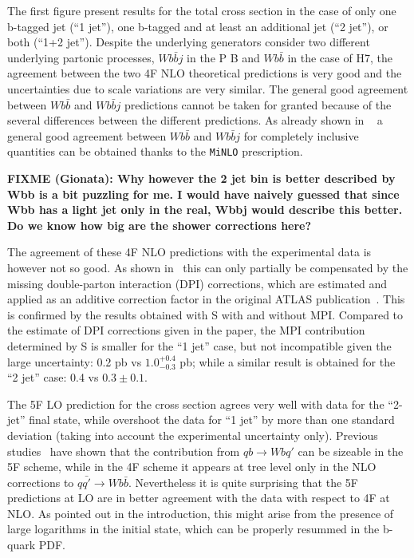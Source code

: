 \documentclass[11pt]{cernrep}
\newcommand{\Sherpa}{S\protect\scalebox{0.8}{HERPA}\xspace}
\newcommand{\Herwig}{H\protect\scalebox{0.8}{ERWIG}7\xspace}
\newcommand\MINLO{{\tt MiNLO}}
\newcommand{\POWHEGBOX}{P\protect\scalebox{0.8}{OWHEG} B\protect\scalebox{0.8}{OX}\xspace}
\begin{document}
The first figure present results for the total cross section in the case of only one
b-tagged jet (``1 jet''), one b-tagged and at least an additional jet
(``2 jet''), or both (``1+2 jet''). Despite the underlying generators
consider two different underlying partonic processes, $Wb\bar{b}j$ in
the \POWHEGBOX{} and $Wb\bar{b}$ in the case of \Herwig, the agreement
between the two 4F NLO theoretical predictions is very good and the uncertainties
due to scale variations are very similar. The general good agreement
between $Wb\bar{b}$ and $Wb\bar{b}j$ predictions cannot be taken for
granted because of the several differences between the different
predictions. As already shown in ~\cite{Luisoni:2015mpa} a general
good agreement between $Wb\bar{b}$ and $Wb\bar{b}j$ for completely
inclusive quantities can be obtained thanks to the \MINLO{}
prescription.

{\bf FIXME (Gionata): Why however the 2 jet bin is better described by Wbb is a bit
  puzzling for me. I would have naively guessed that since Wbb has a
  light jet only in the real, Wbbj would describe this better. Do we
  know how big are the shower corrections here?}

The agreement of these 4F NLO predictions with the experimental data is however not so
good. As shown in~\cite{Luisoni:2015mpa} this can only partially be
compensated by the missing double-parton interaction (DPI)
corrections, which are estimated and applied as an additive correction
factor in the original ATLAS publication~\cite{Aad:2013vka}.
This is confirmed by the results obtained with \Sherpa with and without MPI.  
Compared to the estimate of DPI corrections given in the paper, the MPI contribution determined by \Sherpa is smaller for the ``1 jet''
case, but not incompatible given the large uncertainty: 0.2 pb vs $1.0^{+0.4}_{-0.3}$ pb; while a similar result is obtained
for the ``2 jet'' case: 0.4 vs $0.3\pm0.1$. 

The 5F LO prediction for the cross section agrees very well with data for the ``2-jet'' final state, while overshoot the data for ``1 jet'' by
more than one standard deviation (taking into account the experimental uncertainty only). Previous studies~\cite{Caola:2011pz}
have shown that the contribution from $qb \to Wbq'$ can be sizeable in the 5F scheme, while in the 4F scheme it appears at tree
level only in the NLO corrections to $q\bar{q'}\to Wb\bar{b}$. Nevertheless it is quite surprising that the 5F predictions at LO are in better
agreement with the data with respect to 4F at NLO. As pointed out in the introduction, this might arise from the presence of
large logarithms in the initial state, which can be properly resummed in the b-quark PDF. 
\end{document}
